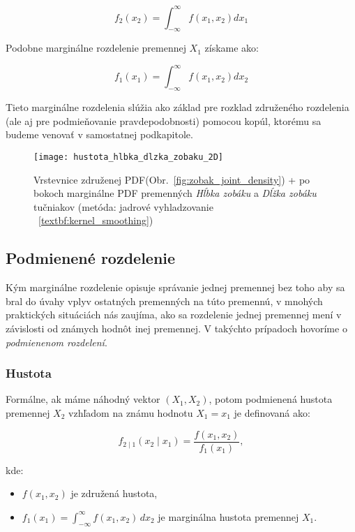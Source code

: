 \begin{equation} f_2(x_2) = \int_{-\infty}^{\infty} f(x_1, x_2) dx_1 \end{equation}

Podobne marginálne rozdelenie premennej $X_1$ získame ako:

\begin{equation} f_1(x_1) = \int_{-\infty}^{\infty} f(x_1, x_2)  dx_2 \end{equation}

Tieto marginálne rozdelenia slúžia ako základ pre rozklad združeného rozdelenia (ale aj pre podmieňovanie pravdepodobnosti) pomocou kopúl, ktorému sa budeme venovať v samostatnej podkapitole.

\begin{figure}[H]
    \centering
    \texttt{[image: hustota\_hlbka\_dlzka\_zobaku\_2D]}
    \caption{Vrstevnice združenej PDF(Obr.~\ref{fig:zobak_joint_density}) + po bokoch marginálne PDF premenných \textit{Hĺbka zobáku} a \textit{Dĺžka zobáku} tučniakov (metóda: jadrové vyhladzovanie ~\ref{textbf:kernel_smoothing})}
    \label{fig:zobak_marg_density}
\end{figure}

\subsection{Podmienené rozdelenie}\label{subsec:conditional_distribution}

Kým marginálne rozdelenie opisuje správanie jednej premennej bez toho aby sa bral do úvahy vplyv ostatných premenných na túto premennú, v mnohých praktických situáciách nás zaujíma, ako sa rozdelenie jednej premennej mení v závislosti od známych hodnôt inej premennej. V takýchto prípadoch hovoríme o \textit{podmienenom rozdelení}.

\subsubsection{Hustota}\label{subsubsec:conditional_density}

Formálne, ak máme náhodný vektor $(X_1, X_2)$, potom podmienená hustota premennej $X_2$ vzhľadom na známu hodnotu $X_1 = x_1$ je definovaná ako:

\begin{equation}
f_{2 \mid 1}(x_2 \mid x_1) = \frac{f(x_1, x_2)}{f_1(x_1)},
\end{equation}

kde:
\begin{itemize}
  \item $f(x_1, x_2)$ je združená hustota,
  \item $f_1(x_1) = \int_{-\infty}^{\infty} f(x_1, x_2) \, dx_2$ je marginálna hustota premennej $X_1$.
\end{itemize}

